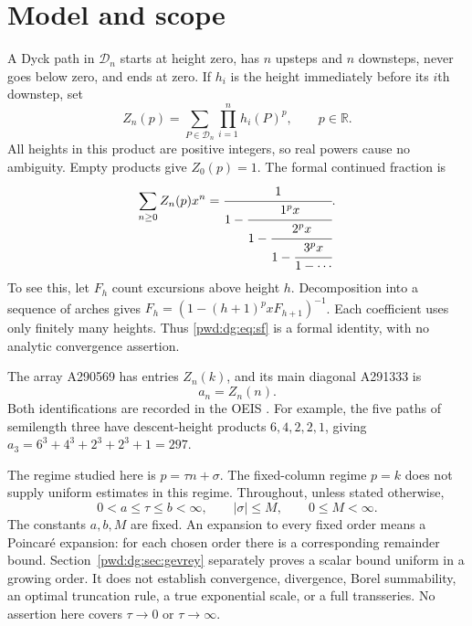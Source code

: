 \documentclass[11pt,letterpaper]{article}
\numberwithin{equation}{section}
\theoremstyle{remark}\newtheorem{remark}[theorem]{Remark}
\newcommand{\D}{\mathcal D}
\begin{document}
\section{Model and scope}\label{pwd:dg:sec:model}
A Dyck path in $\D_n$ starts at height zero, has $n$ upsteps and $n$ downsteps, never goes below zero, and ends at zero. If $h_i$ is the height immediately before its $i$th downstep, set
\begin{equation}\label{pwd:dg:eq:model}
 Z_n(p)=\sum_{P\in\D_n}\prod_{i=1}^n h_i(P)^p,\qquad p\in\mathbb R.
\end{equation}
All heights in this product are positive integers, so real powers cause no ambiguity. Empty products give $Z_0(p)=1$. The formal continued fraction is
\begin{equation}\label{pwd:dg:eq:sf}
 \sum_{n\ge0}Z_n(p)x^n
 =\cfrac{1}{1-\cfrac{1^p x}{1-\cfrac{2^p x}{1-\cfrac{3^p x}{1-\cdots}}}}.
\end{equation}
To see this, let $F_h$ count excursions above height $h$. Decomposition into a sequence of arches gives $F_h=(1-(h+1)^p xF_{h+1})^{-1}$. Each coefficient uses only finitely many heights. Thus \eqref{pwd:dg:eq:sf} is a formal identity, with no analytic convergence assertion.

The array A290569 has entries $Z_n(k)$, and its main diagonal A291333 is
\begin{equation}\label{pwd:dg:eq:diagonal}
 a_n=Z_n(n).
\end{equation}
Both identifications are recorded in the OEIS \cite{oeis291333,oeis290569}. For example, the five paths of semilength three have descent-height products $6,4,2,2,1$, giving $a_3=6^3+4^3+2^3+2^3+1=297$.

The regime studied here is $p=\tau n+\sigma$. The fixed-column regime $p=k$ does not supply uniform estimates in this regime. Throughout, unless stated otherwise,
\begin{equation}\label{pwd:dg:eq:compact}
 0<a\le\tau\le b<\infty,\qquad |\sigma|\le M,\qquad 0\le M<\infty.
\end{equation}
The constants $a,b,M$ are fixed. An expansion to every fixed order means a Poincar\'e expansion: for each chosen order there is a corresponding remainder bound. Section~\ref{pwd:dg:sec:gevrey} separately proves a scalar bound uniform in a growing order. It does not establish convergence, divergence, Borel summability, an optimal truncation rule, a true exponential scale, or a full transseries. No assertion here covers $\tau\to0$ or $\tau\to\infty$.
\end{document}
